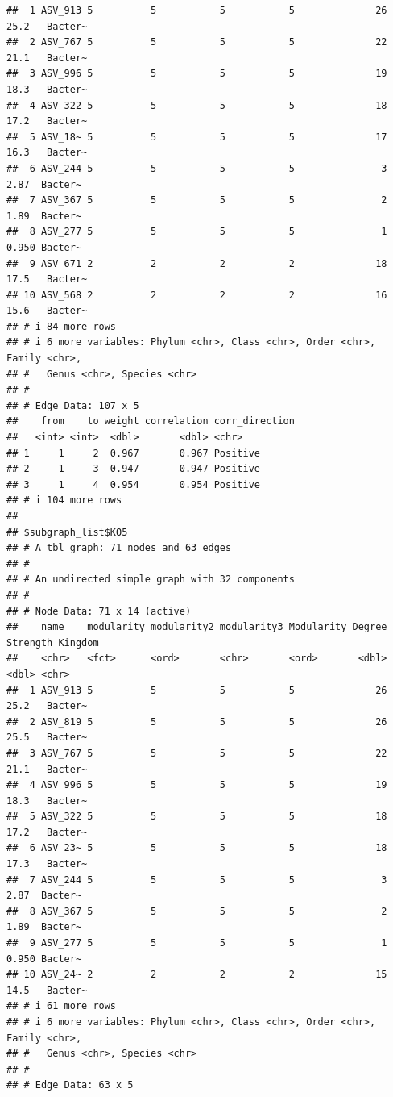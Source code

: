 \documentclass[
]{book}
\begin{document}
\begin{verbatim}
##  1 ASV_913 5          5           5           5              26   25.2   Bacter~
##  2 ASV_767 5          5           5           5              22   21.1   Bacter~
##  3 ASV_996 5          5           5           5              19   18.3   Bacter~
##  4 ASV_322 5          5           5           5              18   17.2   Bacter~
##  5 ASV_18~ 5          5           5           5              17   16.3   Bacter~
##  6 ASV_244 5          5           5           5               3    2.87  Bacter~
##  7 ASV_367 5          5           5           5               2    1.89  Bacter~
##  8 ASV_277 5          5           5           5               1    0.950 Bacter~
##  9 ASV_671 2          2           2           2              18   17.5   Bacter~
## 10 ASV_568 2          2           2           2              16   15.6   Bacter~
## # i 84 more rows
## # i 6 more variables: Phylum <chr>, Class <chr>, Order <chr>, Family <chr>,
## #   Genus <chr>, Species <chr>
## #
## # Edge Data: 107 x 5
##    from    to weight correlation corr_direction
##   <int> <int>  <dbl>       <dbl> <chr>         
## 1     1     2  0.967       0.967 Positive      
## 2     1     3  0.947       0.947 Positive      
## 3     1     4  0.954       0.954 Positive      
## # i 104 more rows
## 
## $subgraph_list$KO5
## # A tbl_graph: 71 nodes and 63 edges
## #
## # An undirected simple graph with 32 components
## #
## # Node Data: 71 x 14 (active)
##    name    modularity modularity2 modularity3 Modularity Degree Strength Kingdom
##    <chr>   <fct>      <ord>       <chr>       <ord>       <dbl>    <dbl> <chr>  
##  1 ASV_913 5          5           5           5              26   25.2   Bacter~
##  2 ASV_819 5          5           5           5              26   25.5   Bacter~
##  3 ASV_767 5          5           5           5              22   21.1   Bacter~
##  4 ASV_996 5          5           5           5              19   18.3   Bacter~
##  5 ASV_322 5          5           5           5              18   17.2   Bacter~
##  6 ASV_23~ 5          5           5           5              18   17.3   Bacter~
##  7 ASV_244 5          5           5           5               3    2.87  Bacter~
##  8 ASV_367 5          5           5           5               2    1.89  Bacter~
##  9 ASV_277 5          5           5           5               1    0.950 Bacter~
## 10 ASV_24~ 2          2           2           2              15   14.5   Bacter~
## # i 61 more rows
## # i 6 more variables: Phylum <chr>, Class <chr>, Order <chr>, Family <chr>,
## #   Genus <chr>, Species <chr>
## #
## # Edge Data: 63 x 5

\end{verbatim}
\end{document}
